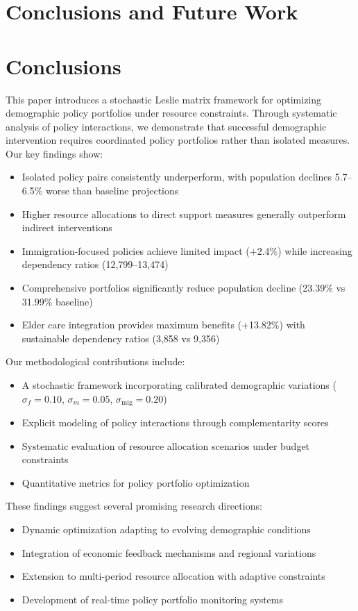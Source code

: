 \documentclass{article} %
\begin{document}
\section{Conclusions and Future Work}
\label{sec:conclusion}

\section{Conclusions}
\label{sec:conclusion}

This paper introduces a stochastic Leslie matrix framework for optimizing demographic policy portfolios under resource constraints. Through systematic analysis of policy interactions, we demonstrate that successful demographic intervention requires coordinated policy portfolios rather than isolated measures. Our key findings show:

\begin{itemize}
    \item Isolated policy pairs consistently underperform, with population declines 5.7--6.5\% worse than baseline projections
    \item Higher resource allocations to direct support measures generally outperform indirect interventions
    \item Immigration-focused policies achieve limited impact (+2.4\%) while increasing dependency ratios (12,799--13,474)
    \item Comprehensive portfolios significantly reduce population decline (23.39\% vs 31.99\% baseline)
    \item Elder care integration provides maximum benefits (+13.82\%) with sustainable dependency ratios (3,858 vs 9,356)
\end{itemize}

Our methodological contributions include:
\begin{itemize}
    \item A stochastic framework incorporating calibrated demographic variations ($\sigma_f = 0.10$, $\sigma_m = 0.05$, $\sigma_{\text{mig}} = 0.20$)
    \item Explicit modeling of policy interactions through complementarity scores
    \item Systematic evaluation of resource allocation scenarios under budget constraints
    \item Quantitative metrics for policy portfolio optimization
\end{itemize}

These findings suggest several promising research directions:
\begin{itemize}
    \item Dynamic optimization adapting to evolving demographic conditions
    \item Integration of economic feedback mechanisms and regional variations
    \item Extension to multi-period resource allocation with adaptive constraints
    \item Development of real-time policy portfolio monitoring systems
\end{itemize}
\end{document}
